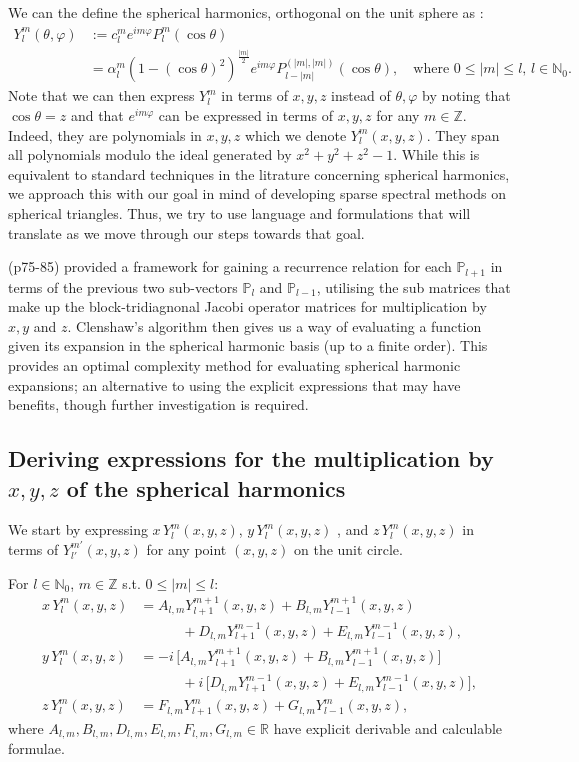 \documentclass[11pt, oneside]{article}   	%
\newcommand{\R}{\mathbb{R}}
\newcommand{\Z}{\mathbb{Z}}
\newcommand{\No}{\mathbb{N}_0}
\newcommand{\Ylm}{Y^m_l}
\newcommand{\Ylmfull}{Y^m_l(\theta,\varphi)}
\newcommand{\Plm}{P^m_l}
\newcommand{\costheta}{\cos\theta}
\newcommand{\eimphi}{e^{im\varphi}}
\newcommand{\alphalm}{\alpha^m_l}
\newcommand{\clm}{c^m_l}
\newcommand{\Alm}{A_{l,m}}
\newcommand{\Blm}{B_{l,m}}
\newcommand{\Dlm}{D_{l,m}}
\newcommand{\Elm}{E_{l,m}}
\newcommand{\Flm}{F_{l,m}}
\newcommand{\Glm}{G_{l,m}}
\newcommand{\bigP}{\mathbb{P}}
\newcommand{\Pl}{\mathbb{P}_l}
\begin{document}
We can the define the spherical harmonics, orthogonal on the unit sphere as \cite{DLMFSphericalandSpheroidalHarmonics, DLMFFerrers, DLMFAssociatedLegendre, efthimiou2014spherical, dai2013approximation}:
\begin{align}
\Ylmfull &:= \clm \eimphi \Plm (\costheta) \\
&= \alphalm (1 - (\costheta)^2)^\frac{|m|}{2} \eimphi P^{(|m|,|m|)}_{l-|m|}(\costheta), \quad \text{where } 0 \le |m| \le l, \, l \in \No.
\end{align} 
Note that we can then express \(\Ylm\) in terms of \(x,y,z\) instead of \(\theta, \varphi\) by noting that \(\costheta = z\) and that \( \eimphi\) can be expressed in terms of \(x,y,z\) for any \(m\in\mathbb{Z}\). Indeed, they are polynomials in $x,y,z$ which we denote $\Ylm(x,y,z)$. They span all polynomials modulo the ideal generated by $x^2 + y^2 + z^2 - 1$. While this is equivalent to standard techniques in the litrature concerning spherical harmonics, we approach this with our goal in mind of developing sparse spectral methods on spherical triangles. Thus, we try to use language and formulations that will translate as we move through our steps towards that goal.

\citep{dunkl2014orthogonal} (p75-85) provided a framework for gaining a recurrence relation for each \(\bigP_{l+1}\) in terms of the previous two sub-vectors \(\Pl\) and \(\bigP_{l-1}\), utilising the sub matrices that make up the block-tridiagnonal Jacobi operator matrices for multiplication by $x, y$ and $z$. Clenshaw's algorithm then gives us a way of evaluating a function given its expansion in the spherical harmonic basis (up to a finite order). This provides an optimal complexity method for evaluating spherical harmonic expansions; an alternative to using the explicit expressions that may have benefits, though further investigation is required.

\subsection{Deriving expressions for the multiplication by \(x, y, z\) of the spherical harmonics}

We start by expressing \(x\,\Ylm(x,y,z)\), \(y\,\Ylm(x,y,z)\) , and \(z\,\Ylm(x,y,z)\)  in terms of \(Y^{m'}_{l'}(x,y,z)\) for any point \((x,y,z)\) on the unit circle.

For \(l \in \No\), \(m \in \Z\) s.t. \(0 \le |m| \le l\):
\begin{align}
x\,\Ylm(x,y,z) &= \Alm Y^{m+1}_{l+1}(x,y,z) +  \Blm Y^{m+1}_{l-1}(x,y,z) \nonumber \\
		     & \quad \quad \quad + \Dlm Y^{m-1}_{l+1}(x,y,z) + \Elm Y^{m-1}_{l-1}(x,y,z), \\
y\,\Ylm(x,y,z) &= - i \, \big[\Alm Y^{m+1}_{l+1}(x,y,z) +  \Blm Y^{m+1}_{l-1}(x,y,z) \big] \nonumber \\
		     &\quad \quad \quad + i \, \big[ \Dlm Y^{m-1}_{l+1}(x,y,z) + \Elm Y^{m-1}_{l-1}(x,y,z) \big], \\
z\,\Ylm(x,y,z) &= \Flm Y^{m}_{l+1}(x,y,z) + \Glm Y^{m}_{l-1}(x,y,z) ,
\end{align}
where \(\Alm, \Blm, \Dlm, \Elm, \Flm, \Glm \in \R\) have explicit derivable and calculable formulae.
\end{document}
